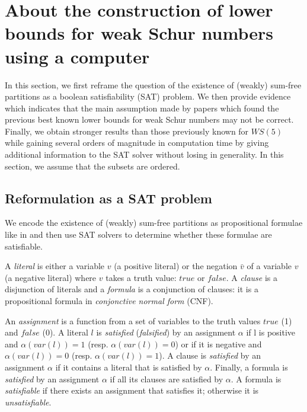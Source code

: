 \section{About the construction of lower bounds for weak Schur numbers using a computer}

In this section, we first reframe the question of the existence of (weakly) sum-free partitions as a boolean
satisfiability (SAT) problem. We then provide evidence which indicates that the main assumption made by papers which
found the previous best known lower bounds for weak Schur numbers may not be correct. Finally, we obtain stronger
results than those previously known for \(WS(5)\) while gaining several orders of magnitude in computation time by
giving additional information to the SAT solver without losing in generality. In this section, we assume that the
subsets are ordered.


\subsection{Reformulation as a SAT problem}
\label{SAT}

We encode the existence of (weakly) sum-free partitions as propositional formulae like in
\cite{Heule2017} and then use
SAT solvers to determine whether these formulae are satisfiable.

\begin{definition}
A \textit{literal} is either a variable \(v\) (a positive literal) or the negation \(\bar{v}\) of a variable \(v\) (a
negative literal) where \(v\)
takes a truth value: \(true\) or \(false\). A \textit{clause} is a disjunction of literals and a \textit{formula} is a
conjunction of clauses: it
is a propositional formula in \textit{conjonctive normal form} (CNF).
\end{definition}

\begin{definition}
An \textit{assignment} is a function from a set of variables to the truth values \(true\) (1) and \(false\) (0). A
literal \(l\) is
\textit{satisfied} (\textit{falsified}) by an assignment \(\alpha\) if l is positive and \(\alpha(var (l)) = 1\)
(resp. \(\alpha(var (l)) = 0\)) or if it is negative and \(\alpha(var (l)) = 0\) (resp. \(\alpha(var (l)) = 1\)). A
clause is \textit{satisfied}
by an assignment \(\alpha\) if it contains a literal that is satisfied by \(\alpha\). Finally, a formula is
\textit{satisfied} by an assignment
\(\alpha\) if all its clauses are satisfied by \(\alpha\). A formula is \textit{satisfiable} if there exists an
assignment that satisfies it;
otherwise it is \textit{unsatisfiable}.
\end{definition}

